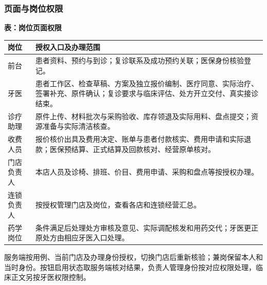 \documentclass[UTF8,a4paper,zihao=-4,fontset=none]{ctexart}
\begin{document}
\subsubsection{页面与岗位权限}
{\small\setlength{\tabcolsep}{3pt}\renewcommand{\arraystretch}{1.08}
\noindent\textbf{表\thetable：岗位页面权限}\par\smallskip
\noindent\begin{tabular}{@{}>{\raggedright\arraybackslash}p{3.2cm}>{\raggedright\arraybackslash}p{22.3cm}@{}}
\toprule
岗位 & 授权入口及办理范围 \\ \midrule
前台 & 患者资料、预约与到诊；复诊联系及成功预约关联；医保身份核验登记。 \\
牙医 & 患者工作区、检查草稿、方案及独立报价编制、医疗同意、实际治疗、签署补充、原件确认；复诊要求与临床评估、处方开立交付、真实接诊结束。 \\
诊疗助理 & 原件上传、材料批次与采购验收、库存领退及实际用料、盘点提交；资源准备与实际清洁核查。 \\
收费人员 & 报价核价出具及费用决定、账单与患者付款核实、费用申请和实际退款；医保预结算、正式结算及回款核对、经营原单核对。 \\
门店负责人 & 本店人员及诊椅、排班、价目、费用申请、采购和盘点等按授权办理。 \\
连锁负责人 & 按授权管理门店及岗位，查看各店和连锁经营汇总。 \\
药学岗位 & 条件满足后处理处方审核及意见、实际调配核发和用药交代；牙医更正原处方由相应牙医入口处理。 \\
\bottomrule
\end{tabular}\par}
\smallskip
服务端按用例、当前门店及办理身份授权，切换门店后重新核验；兼岗保留本人和当时身份。按钮启用状态取服务端核对结果，负责人管理身份按对应权限处理，临床正文另按牙医权限控制。\par
\end{document}

